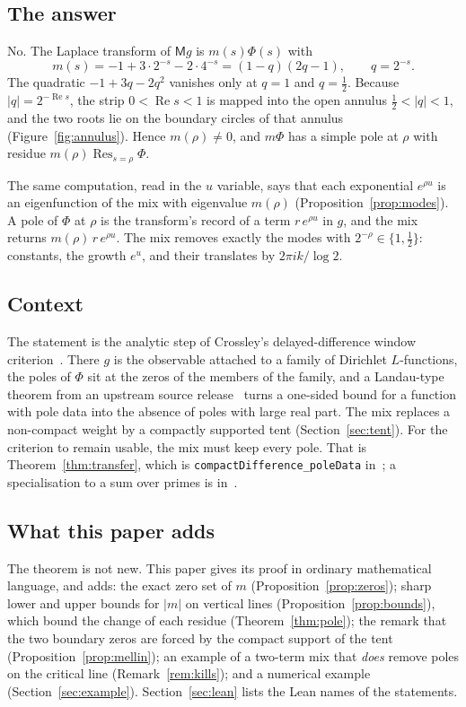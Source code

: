 \documentclass[11pt]{amsart}
\theoremstyle{definition}
\theoremstyle{remark}
\DeclareMathOperator{\re}{Re}
\DeclareMathOperator*{\res}{Res}
\newcommand{\M}{\mathsf{M}}
\newcommand{\lean}[1]{\texttt{#1}}
\begin{document}
\subsection{The answer}
No. The Laplace transform of $\M g$ is $m(s)\Phi(s)$ with
\begin{equation}\label{eq:symbol}
m(s)=-1+3\cdot 2^{-s}-2\cdot 4^{-s}=(1-q)(2q-1),\qquad q=2^{-s}.
\end{equation}
The quadratic $-1+3q-2q^2$ vanishes only at $q=1$ and $q=\tfrac12$. Because $|q|=2^{-\re s}$,
the strip $0<\re s<1$ is mapped into the open annulus $\tfrac12<|q|<1$, and the two roots lie on the
boundary circles of that annulus (Figure~\ref{fig:annulus}). Hence $m(\rho)\ne0$, and
$m\Phi$ has a simple pole at $\rho$ with residue $m(\rho)\res_{s=\rho}\Phi$.

The same computation, read in the $u$ variable, says that each exponential $e^{\rho u}$ is an
eigenfunction of the mix with eigenvalue $m(\rho)$ (Proposition~\ref{prop:modes}). A pole of $\Phi$ at
$\rho$ is the transform's record of a term $r\,e^{\rho u}$ in $g$, and the mix returns
$m(\rho)\,r\,e^{\rho u}$. The mix removes exactly the modes with $2^{-\rho}\in\{1,\tfrac12\}$:
constants, the growth $e^{u}$, and their translates by $2\pi i k/\log 2$.

\subsection{Context}
The statement is the analytic step of Crossley's delayed-difference window
criterion~\cite{Crossley-transfer}. There $g$ is the observable attached to a family of Dirichlet
$L$-functions, the poles of $\Phi$ sit at the zeros of the members of the family, and a
Landau-type theorem from an upstream source release~\cite{upstream} turns a one-sided bound for a
function with pole data into the absence of poles with large real part. The mix replaces a
non-compact weight by a compactly supported tent (Section~\ref{sec:tent}). For the criterion to
remain usable, the mix must keep every pole. That is Theorem~\ref{thm:transfer}, which is
\lean{compactDifference\_poleData} in~\cite{Crossley-transfer}; a specialisation to a sum over
primes is in~\cite{Crossley-prime}.

\subsection{What this paper adds}
The theorem is not new. This paper gives its proof in ordinary mathematical language, and adds:
the exact zero set of $m$ (Proposition~\ref{prop:zeros}); sharp lower and upper bounds for $|m|$ on
vertical lines (Proposition~\ref{prop:bounds}), which bound the change of each residue
(Theorem~\ref{thm:pole}); the remark that the two boundary zeros are forced by the compact support
of the tent (Proposition~\ref{prop:mellin}); an example of a two-term mix that \emph{does} remove
poles on the critical line (Remark~\ref{rem:kills}); and a numerical example
(Section~\ref{sec:example}). Section~\ref{sec:lean} lists the Lean names of the statements.
\end{document}
